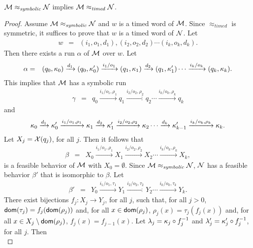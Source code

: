 \begin{theorem}
\label{symbolicimpliestimed}
${\cal M} \approx_{\mathit{symbolic}} {\cal N}$
implies
${\cal M} \approx_{\mathit{timed}} {\cal N}$.
\end{theorem}
\begin{proof}
Assume ${\cal M} \approx_{\mathit{symbolic}} {\cal N}$ and $w$ is a timed word of ${\cal M}$.
Since $\approx_{\mathit{timed}}$ is symmetric, it suffices to prove that $w$ is a timed word of ${\cal N}$.
Let
\begin{eqnarray*}
w & = &  (i_1, o_1, d_1), (i_2, o_2, d_2) \cdots (i_k, o_k, d_k).
\end{eqnarray*}
Then there exists a run $\alpha$ of ${\cal M}$ over $w$. Let 
\begin{eqnarray*}
\alpha & = & (q_0, \kappa_0) \xrightarrow{d_1} (q_0, \kappa'_0) \xrightarrow{i_1/o_1} (q_1, \kappa_1) \xrightarrow{d_2} (q_1, \kappa'_1)  \cdots
 \xrightarrow{i_k/o_k} (q_k, \kappa_k).
\end{eqnarray*}
This implies that ${\cal M}$ has a symbolic run
\begin{eqnarray*}
\gamma & = & q_0 \xrightarrow{i_1/o_1, \rho_1} q_1  \xrightarrow{i_2/o_2, \rho_2} q_2 \cdots \xrightarrow{i_k/o_k, \rho_k} q_k
\end{eqnarray*}
and
\[
\kappa_0 \xrightarrow{d_1} \kappa'_0 \xrightarrow{i_1/o_1, \rho_1} \kappa_1 \xrightarrow{d_2} \kappa'_1 \xrightarrow{i_2/o_2, \rho_2} \kappa_2 \cdots
\xrightarrow{d_k} \kappa'_{k-1} \xrightarrow{i_k/o_k, \rho_k} \kappa_{k}.
\]
Let $X_j = \mathcal{X}(q_j)$, for all $j$. Then it follows that
\begin{eqnarray*}
\beta & = & X_0 \xrightarrow{i_1/o_1, \rho_1} X_1  \xrightarrow{i_2/o_2, \rho_2} X_2 \cdots \xrightarrow{i_k/o_k, \rho_k} X_{k},
\end{eqnarray*}
is a feasible behavior of ${\cal M}$ with $X_0 = \emptyset$.
Since  ${\cal M} \approx_{\mathit{symbolic}} {\cal N}$, ${\cal N}$ has a feasible behavior $\beta'$ that is isomorphic to $\beta$.
Let
\begin{eqnarray*}
\beta' & = & Y_0 \xrightarrow{i_1/o_1, \tau_1} Y_1  \xrightarrow{i_2/o_2, \tau_2} Y_2 \cdots \xrightarrow{i_k/o_k, \tau_k} Y_{k}.
\end{eqnarray*}
There exist bijections $f_j : X_j \rightarrow Y_j$, for all $j$, such that, for all $j>0$, ${\textsf{dom}}(\tau_j) = f_j({\textsf{dom}}(\rho_j))$ and, for all $x \in{\textsf{dom}}(\rho_j)$,
$\rho_j(x) = \tau_j (f_j(x))$ and, for all $x \in X_j \setminus {\textsf{dom}}(\rho_j)$, $f_j(x) = f_{j-1}(x)$.
Let $\lambda_j = \kappa_j \circ f_j^{-1}$ and $\lambda'_j = \kappa'_j \circ f_j^{-1}$, for all $j$. Then
\[
\]
\end{proof}
